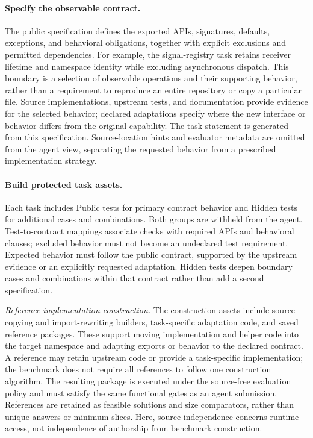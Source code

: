 \documentclass[acmsmall,screen,review,anonymous,nonacm]{acmart}
\begin{document}
\paragraph{Specify the observable contract.}
The public specification defines the exported APIs, signatures, defaults,
exceptions, and behavioral obligations, together with explicit exclusions and
permitted dependencies. For example, the signal-registry task retains receiver
lifetime and namespace identity while excluding asynchronous dispatch.
This boundary is a selection of observable operations and their supporting
behavior, rather than a requirement to reproduce an entire repository or copy
a particular file. Source implementations, upstream tests, and documentation
provide evidence for the selected behavior; declared adaptations specify where
the new interface or behavior differs from the original capability.
The task statement is generated from this specification. Source-location hints
and evaluator metadata are omitted from the agent view, separating the requested
behavior from a prescribed implementation strategy.

\paragraph{Build protected task assets.}
Each task includes Public tests for primary contract behavior and Hidden tests
for additional cases and combinations. Both groups are withheld from the agent.
Test-to-contract mappings associate checks with required APIs and behavioral
clauses; excluded behavior must not become an undeclared test requirement.
Expected behavior must follow the public contract, supported by the upstream
evidence or an explicitly requested adaptation. Hidden tests deepen boundary
cases and combinations within that contract rather than add a second specification.

\emph{Reference implementation construction.}
The construction assets include source-copying and import-rewriting builders,
task-specific adaptation code, and saved reference packages. These support
moving implementation and helper code into the target namespace and adapting
exports or behavior to the declared contract. A reference may retain upstream
code or provide a task-specific implementation; the benchmark does not require
all references to follow one construction algorithm. The resulting package is
executed under the source-free evaluation policy and must satisfy the same
functional gates as an agent submission. References are retained as feasible
solutions and size comparators, rather than unique answers or minimum slices.
Here, source independence concerns runtime access, not independence of authorship
from benchmark construction.
\end{document}
